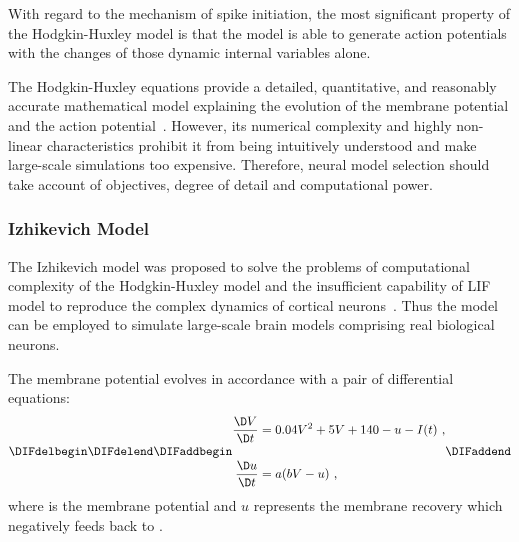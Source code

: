 With regard to the mechanism of spike initiation, the most significant property of the Hodgkin-Huxley model is that the model is able to generate action potentials with the changes of those dynamic internal variables alone.

The Hodgkin-Huxley equations provide a detailed, quantitative, and reasonably accurate mathematical model explaining the evolution of the membrane potential and the action potential~\citep{byrne2014molecules}.
However, its numerical complexity and highly non-linear characteristics prohibit it from being intuitively understood and make large-scale simulations too expensive.
Therefore, neural model selection should take account of objectives, degree of detail and computational power.

\subsubsection{Izhikevich Model}
The Izhikevich model was proposed to solve the problems of computational complexity of the Hodgkin-Huxley model and the insufficient capability of LIF model to reproduce the complex dynamics of cortical neurons~\citep{izhikevich2003simple}.
Thus the model can be employed to simulate large-scale brain models comprising real biological neurons.

The membrane potential evolves in accordance with a pair of differential equations:
\begin{equation}
\DIFdelbegin %
\DIFdelend \DIFaddbegin \begin{aligned}
\dfrac{\D V}{\D t} &= 0.04V^2 + 5V + 140 - u - I(t)~,\\[10pt]
\dfrac{\D u}{\D t} &= a(bV - u)~,
\end{aligned}
\DIFaddend \end{equation}
where \DIFdelbegin {}\DIFdelend \DIFaddbegin {}\DIFaddend is the membrane potential and $u$ represents the membrane recovery which negatively feeds back to \DIFdelbegin {}\DIFdelend \DIFaddbegin {}\DIFaddend .

